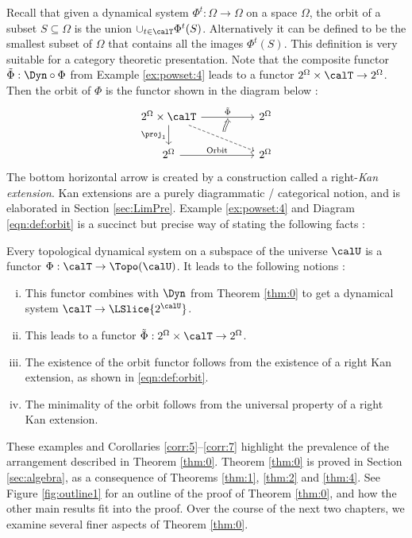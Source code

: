 \documentclass[12pt,oneside]{article}
\begin{document}
Recall that given a dynamical system $\Phi^t : \Omega \to \Omega$ on a space $\Omega$, the orbit of a subset $S\subseteq\Omega$ is the union $\cup_{t\in \calT} \Phi^t(S)$. Alternatively it can be defined to be the smallest subset of $\Omega$ that contains all the images $\Phi^t(S)$. This definition is very suitable for a category theoretic presentation. Note that the composite functor $\tilde\Phi : \Dyn \circ \Phi$ from Example \ref{ex:powset:4} leads to a functor $2^{\Omega} \times \calT \to 2^{\Omega}$. Then the orbit of $\Phi$ is the functor shown in the diagram below :
%
\begin{equation} \label{eqn:def:orbit}
	\begin{tikzcd}
		2^{\Omega} \times \calT \arrow[d, "\proj_1"'] \arrow[dashed]{drr}[name = n2]{} \arrow{rr}[name = n1]{\tilde\Phi} && 2^{\Omega} \\
		2^{\Omega} \arrow[rr, "\text{Orbit}"] && 2^{\Omega}
		\arrow[shorten <=1pt, shorten >=1pt, Rightarrow, to path={(n2) to[out=90,in=270] (n1)} ]{  }
	\end{tikzcd}
\end{equation}
%
The bottom horizontal arrow is created by a construction called a right-\emph{Kan extension}. Kan extensions are a purely diagrammatic / categorical notion, and is elaborated in Section \ref{sec:LimPre}. Example \ref{ex:powset:4} and Diagram \eqref{eqn:def:orbit} is a succinct but precise way of stating the following facts : 

\begin{corollary} \label{corr:7}
	Every topological dynamical system on a subspace of the universe $\calU$  is a functor $\Phi : \calT \to \Topo(\calU)$. It leads to the following notions :
	\begin{enumerate} [(i)]
		\item This functor combines with $\Dyn$ from Theorem \ref{thm:0} to get a dynamical system $\calT \to \LSlice{ 2^{\calU} }$.
		\item This leads to a functor $\tilde\Phi : 2^{\Omega} \times \calT \to 2^{\Omega}$.
		\item The existence of the orbit functor follows from the existence of a right Kan extension, as shown in \eqref{eqn:def:orbit}.
		\item The minimality of the orbit follows from the universal property of a right Kan extension.
	\end{enumerate}
\end{corollary}

These examples and Corollaries \ref{corr:5}--\ref{corr:7} highlight the prevalence of the arrangement described in Theorem \ref{thm:0}. Theorem \ref{thm:0} is proved in Section \ref{sec:algebra}, as a consequence of Theorems \ref{thm:1}, \ref{thm:2} and \ref{thm:4}. See Figure \ref{fig:outline1} for an outline of the proof of Theorem \ref{thm:0}, and how the other main results fit into the proof. Over the course of the next two chapters, we examine several finer aspects of Theorem \ref{thm:0}. 
 
\end{document}
